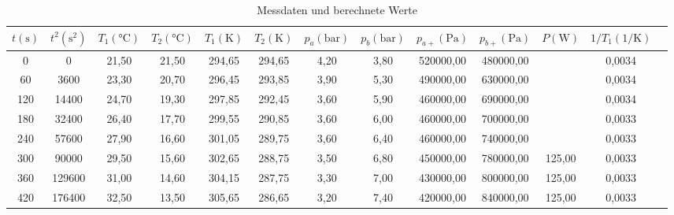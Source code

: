  \begin{table}
    \caption{Messdaten und berechnete Werte}
    \label{tab:some_data}
    \begin{tabular}{S[table-format=3.0] S S S S S S S S S S S S[table-format=3.2]}
      \toprule
      {$t (\unit{\second})$} &
      {$t^{2} (\unit{\second\squared})$}&
      {$T_{1} (\unit{\celsius})$}&
      {$T_{2} (\unit{\celsius})$}&
      {$T_{1} (\unit{\kelvin})$}&
      {$T_{2} (\unit{\kelvin})$}&
      {$p_{a} (\unit{\bar})$}&
      {$p_{b} (\unit{\bar})$}&
      {$p_{a+} (\unit{\pascal})$}&
      {$p_{b+} (\unit{\pascal})$}&
      {$P (\unit{\watt})$}&
      {$1/T_{1} (1/\unit{\kelvin})$}& \\
        &         0   &   21,50   &    21,50   &  294,65   &  294,65   &      4,20   &      3,80   &  520000,00   &   480000,00   &        &      0,0034  \\
        60  &      3600   &   23,30   &    20,70   &  296,45   &  293,85   &      3,90   &      5,30   &  490000,00   &   630000,00   &        &      0,0034  \\
       120  &     14400   &   24,70   &    19,30   &  297,85   &  292,45   &      3,60   &      5,90   &  460000,00   &   690000,00   &        &      0,0034  \\
       180  &     32400   &   26,40   &    17,70   &  299,55   &  290,85   &      3,60   &      6,00   &  460000,00   &   700000,00   &        &      0,0033  \\
       240  &     57600   &   27,90   &    16,60   &  301,05   &  289,75   &      3,60   &      6,40   &  460000,00   &   740000,00   &        &      0,0033  \\
       300  &     90000   &   29,50   &    15,60   &  302,65   &  288,75   &      3,50   &      6,80   &  450000,00   &   780000,00   &  125,00    &      0,0033  \\
       360  &    129600   &   31,00   &    14,60   &  304,15   &  287,75   &      3,30   &      7,00   &  430000,00   &   800000,00   &  125,00    &      0,0033  \\
       420  &    176400   &   32,50   &    13,50   &  305,65   &  286,65   &      3,20   &      7,40   &  420000,00   &   840000,00   &  125,00    &      0,0033  \\

\end{tabular}
\end{table}
